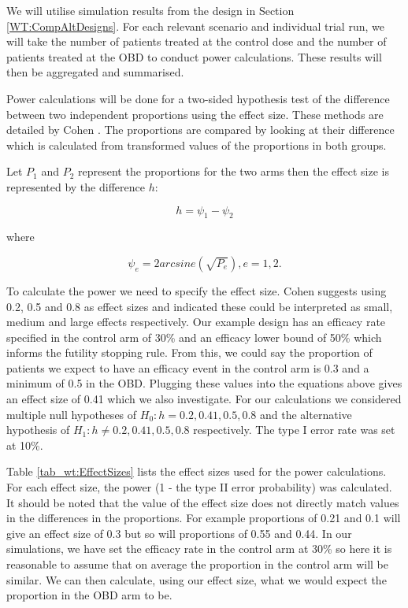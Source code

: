 We will utilise simulation results from the design in Section \ref{WT:CompAltDesigns}. For each relevant scenario and individual trial run, we will take the number of patients treated at the control dose and the number of patients treated at the OBD to conduct power calculations. These results will then be aggregated and summarised.  

Power calculations will be done for a two-sided hypothesis test of the difference between two independent proportions using the effect size. These methods are detailed by Cohen \cite{cohenStatisticalPowerAnalysis1988}. The proportions are compared by looking at their difference which is calculated from transformed values of the proportions in both groups.

Let $P_{1}$ and $P_{2}$ represent the proportions for the two arms then the effect size is represented by the difference $h$: 

\begin{equation}
	h = \psi_1 - \psi_2
\end{equation}

where 

\begin{equation}
	\psi_e = 2arcsine(\sqrt{P_e}), e = 1,2.
\end{equation}

To calculate the power we need to specify the effect size.  Cohen \cite{cohenStatisticalPowerAnalysis1988} suggests using 0.2, 0.5 and 0.8 as effect sizes and indicated these could be interpreted as small, medium and large effects respectively. Our example design has an efficacy rate specified in the control arm of 30\% and an efficacy lower bound of 50\% which informs the futility stopping rule. From this, we could say the proportion of patients we expect to have an efficacy event in the control arm is 0.3 and a minimum of 0.5 in the OBD. Plugging these values into the equations above gives an effect size of 0.41 which we also investigate.  For our calculations we considered multiple null hypotheses of $H_0: h = 0.2,0.41,0.5,0.8$ and the alternative hypothesis of $H_1: h \neq 0.2,0.41,0.5,0.8$ respectively. The type \RN{1} error rate was set at 10\%.

Table \ref{tab_wt:EffectSizes} lists the effect sizes used for the power calculations. For each effect size, the power (1 - the type \RN{2} error probability) was calculated. It should be noted that the value of the effect size does not directly match values in the differences in the proportions. For example proportions of 0.21 and 0.1 will give an effect size of 0.3 but so will proportions of 0.55 and 0.44. In our simulations, we have set the efficacy rate in the control arm at 30\% so here it is reasonable to assume that on average the proportion in the control arm will be similar. We can then calculate, using our effect size, what we would expect the proportion in the OBD arm to be. 

